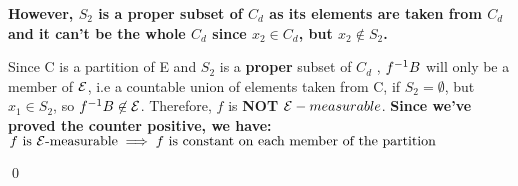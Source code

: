 \textbf{However, $S_2$ is a \textbf{proper} subset of $C_d$ as its elements are taken from $C_d$ and it can't be the whole $C_d$ since $x_2 \in C_d$, but $x_2 \not \in S_2$.}

Since C is a partition of E and $S_2$ is a \textbf{proper} subset of $C_d$ , $f^{-1}{B}$ will only be a member of $\cal{E}$, i.e a countable union of elements taken from C, if $S_2 = \emptyset$, but $x_1 \in S_2$, so $f^{-1}{B} \not \in \cal{E}$. Therefore, $f$ is \textbf{NOT} $\mathcal{E}-measurable$. \textbf{Since we've proved the counter positive, we have:\\
$f \text{ is } \mathcal{E} \text{-measurable} \implies f \text{ is constant on each member of the partition}$}



\qed

